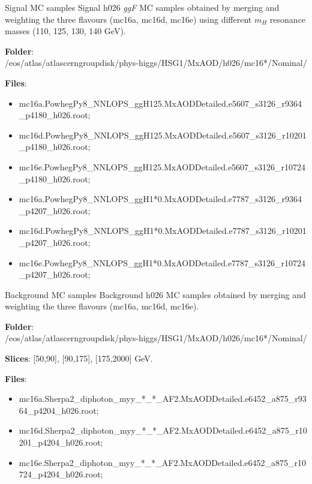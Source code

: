 \documentclass[10pt,UKenglish, leqno, xcolor = dvipsnames]{beamer}
\begin{document}
	\begin{frame}{Signal MC samples}
		\vfill
		Signal h026 \textit{ggF} MC samples obtained by merging and weighting the three flavours (mc16a, mc16d, mc16e) using different $m_H$ resonance masses (110, 125, 130, 140 GeV).
		
		\vspace{.5cm}
		\textbf{Folder}:\\ 
		{\small
			/eos/atlas/atlascerngroupdisk/phys-higgs/HSG1/MxAOD/h026/mc16*/Nominal/
		}
		
		\vspace{.5cm}
		\textbf{Files}: 
		\begin{itemize}
			\item {\scriptsize mc16a.PowhegPy8\_NNLOPS\_ggH125.MxAODDetailed.e5607\_s3126\_r9364\_p4180\_h026.root;
			}
			\item {\scriptsize mc16d.PowhegPy8\_NNLOPS\_ggH125.MxAODDetailed.e5607\_s3126\_r10201\_p4180\_h026.root;}
			\item {\scriptsize mc16e.PowhegPy8\_NNLOPS\_ggH125.MxAODDetailed.e5607\_s3126\_r10724\_p4180\_h026.root;}
			\item {\scriptsize mc16a.PowhegPy8\_NNLOPS\_ggH1*0.MxAODDetailed.e7787\_s3126\_r9364\_p4207\_h026.root;}
			\item {\scriptsize mc16d.PowhegPy8\_NNLOPS\_ggH1*0.MxAODDetailed.e7787\_s3126\_r10201\_p4207\_h026.root;}
			\item {\scriptsize mc16e.PowhegPy8\_NNLOPS\_ggH1*0.MxAODDetailed.e7787\_s3126\_r10724\_p4207\_h026.root;}
		\end{itemize}
	\end{frame}
	
	\begin{frame}{Background MC samples}
		\vfill
		Background h026 MC samples obtained by merging and weighting the three flavours (mc16a, mc16d, mc16e).
		
		\vspace{.5cm}
		\textbf{Folder}:\\ 
		{\small
			/eos/atlas/atlascerngroupdisk/phys-higgs/HSG1/MxAOD/h026/mc16*/Nominal/
		}
		
		\vspace{.5cm}
		\textbf{Slices}: [50,90], [90,175], [175,2000] GeV.
		
		\vspace{.5cm}
		\textbf{Files}:
		\begin{itemize}
			\item {\scriptsize mc16a.Sherpa2\_diphoton\_myy\_*\_*\_AF2.MxAODDetailed.e6452\_a875\_r9364\_p4204\_h026.root;}
			\item {\scriptsize mc16d.Sherpa2\_diphoton\_myy\_*\_*\_AF2.MxAODDetailed.e6452\_a875\_r10201\_p4204\_h026.root;}
			\item {\scriptsize mc16e.Sherpa2\_diphoton\_myy\_*\_*\_AF2.MxAODDetailed.e6452\_a875\_r10724\_p4204\_h026.root;}
		\end{itemize}
		\vfill
	\end{frame}
	
\end{document}
